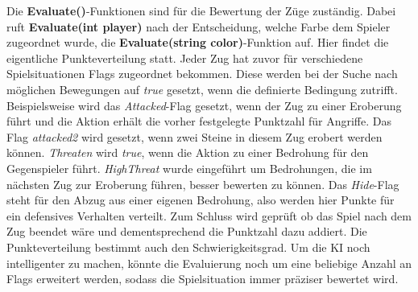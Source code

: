 Die \textbf{Evaluate()}-Funktionen sind für die Bewertung der Züge zuständig. Dabei ruft \textbf{Evaluate(int player)} nach der Entscheidung, welche Farbe dem Spieler zugeordnet wurde, die \textbf{Evaluate(string color)}-Funktion auf. Hier findet die eigentliche Punkteverteilung statt. Jeder Zug hat zuvor für verschiedene Spielsituationen Flags zugeordnet bekommen. Diese werden bei der Suche nach möglichen Bewegungen auf \textit{true} gesetzt, wenn die definierte Bedingung zutrifft. Beispielsweise wird das \textit{Attacked}-Flag gesetzt, wenn der Zug zu einer Eroberung führt und die Aktion erhält die vorher festgelegte Punktzahl für Angriffe. Das Flag \textit{attacked2} wird gesetzt, wenn zwei Steine in diesem Zug erobert werden können. \textit{Threaten} wird \textit{true}, wenn die Aktion zu einer Bedrohung für den Gegenspieler führt. \textit{HighThreat} wurde eingeführt um Bedrohungen, die im nächsten Zug zur Eroberung führen, besser bewerten zu können. Das \textit{Hide}-Flag steht für den Abzug aus einer eigenen Bedrohung, also werden hier Punkte für ein defensives Verhalten verteilt. Zum Schluss wird geprüft ob das Spiel nach dem Zug beendet wäre und dementsprechend die Punktzahl dazu addiert. Die Punkteverteilung bestimmt auch den Schwierigkeitsgrad. Um die KI noch intelligenter zu machen, könnte die Evaluierung noch um eine beliebige Anzahl an Flags erweitert werden, sodass die Spielsituation immer präziser bewertet wird.

